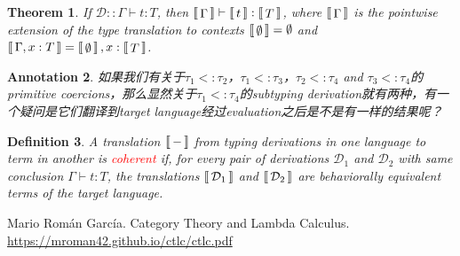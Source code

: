 \documentclass{article}
\theoremstyle{plain}
\newtheorem{theorem}{Theorem}
\newtheorem{definition}[theorem]{Definition}
\newtheorem{annotation}[theorem]{Annotation}
\theoremstyle{nonumberplain}
\newcommand{\termtype}[2]{\ensuremath{#1:#2}}
\newcommand{\redt}[1]{\textcolor{red}{#1}}
\newcommand{\dbracket}[1]{\ensuremath{\left\llbracket\,\vcenter{\hbox{$#1$}}\,\right\rrbracket}}
\begin{document}
\begin{theorem}
\rm If $\mathcal{D}::\Gamma \vdash \termtype{t}{T}$, then $\dbracket{\Gamma} \vdash \termtype{\dbracket{t}}{\dbracket{T}}$, where $\dbracket{\Gamma}$ is the pointwise extension of the type translation to contexts $\dbracket{\emptyset} = \emptyset$ and $\dbracket{\Gamma,\termtype{x}{T}} = \dbracket{\emptyset},\termtype{x}{\dbracket{T}}$. 
\end{theorem}

\begin{annotation}
\rm 如果我们有关于$\tau_1<:\tau_2$，$\tau_1 <: \tau_3$，$\tau_2<:\tau_4$ and $\tau_3<:\tau_4$的primitive coercions，那么显然关于$\tau_1 <: \tau_4$的subtyping derivation就有两种，有一个疑问是它们翻译到target language经过evaluation之后是不是有一样的结果呢？
\end{annotation}


\begin{definition}
\rm A translation $\dbracket{-}$ from typing derivations in one language to term in another is \redt{coherent} if, for every pair of derivations $\mathcal{D}_1$ and $\mathcal{D}_2$ with same conclusion $\Gamma \vdash \termtype{t}{T}$, the translations $\dbracket{\mathcal{D}_1}$ and $\dbracket{\mathcal{D}_2}$ are behaviorally equivalent terms of the target language.
\end{definition}

\newpage
\begin{thebibliography}{00}
 Mario Román García. Category Theory and Lambda Calculus. \url{https://mroman42.github.io/ctlc/ctlc.pdf}
\end{thebibliography}
\end{document}
